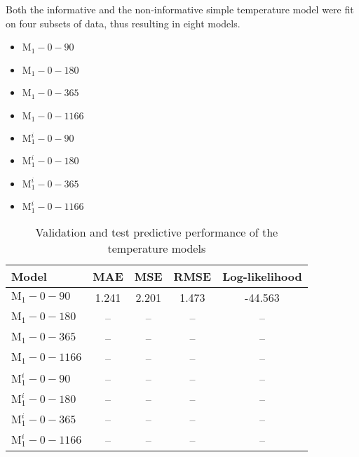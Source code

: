 Both the informative and the non-informative simple temperature model were 
fit on four subsets of data, thus resulting in eight models. 
\begin{itemize}
  \item $\text{M}_1-0-90$
  \item $\text{M}_1-0-180$
  \item $\text{M}_1-0-365$
  \item $\text{M}_1-0-1166$
  \item $\text{M}_1^i-0-90$ 
  \item $\text{M}_1^i-0-180$ 
  \item $\text{M}_1^i-0-365$ 
  \item $\text{M}_1^i-0-1166$
\end{itemize}

\begin{table}[h!]
\centering
\caption{Validation and test predictive performance of the temperature models}
\begin{tabular}{lcccc}
\toprule
\textbf{Model} & \textbf{MAE} & \textbf{MSE} & \textbf{RMSE} & \textbf{Log-likelihood} \\
\midrule
$\text{M}_1-0-90$ & 1.241 & 2.201 & 1.473 & -44.563 \\
$\text{M}_1-0-180$ & -- & -- & -- & -- \\
$\text{M}_1-0-365$ & -- & -- & -- & -- \\
$\text{M}_1-0-1166$ & -- & -- & -- & -- \\
$\text{M}_1^i-0-90$ & -- & -- & -- & -- \\
$\text{M}_1^i-0-180$ & -- & -- & -- & -- \\
$\text{M}_1^i-0-365$ & -- & -- & -- & -- \\
$\text{M}_1^i-0-1166$ & -- & -- & -- & -- \\
\bottomrule
\end{tabular}
\label{table:temp_models_performance}
\end{table}

